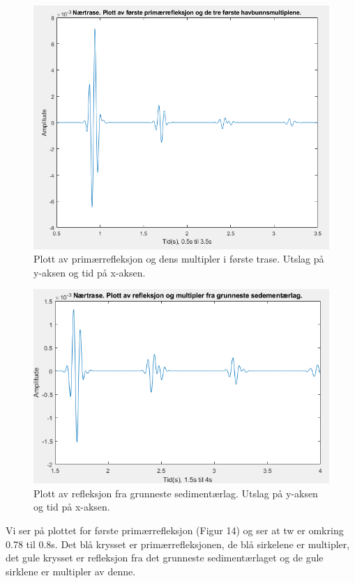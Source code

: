 \documentclass[11pt]{article}
\begin{document}
\begin{figure}[H]
\includegraphics[scale=0.7]{4a_impuls.png}
\caption{Plott av primærrefleksjon og dens multipler i første trase. Utslag på y-aksen og tid på x-aksen.}
\end{figure}

\begin{figure}[H]
\includegraphics[scale=0.9]{4b_impuls.png}
\caption{Plott av refleksjon fra grunneste sedimentærlag. Utslag på y-aksen og tid på x-aksen.}
\end{figure}

Vi ser på plottet for første primærrefleksjon (Figur 14) og ser at tw er omkring 0.78 til 0.8s. Det blå krysset er primærrefleksjonen, de blå sirkelene er multipler, det gule krysset er refleksjon fra det grunneste sedimentærlaget og de gule sirklene er multipler av denne. 
\end{document}
